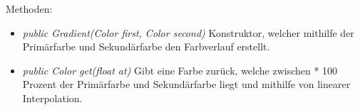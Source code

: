 Methoden:
\begin{itemize} 
    \item \emph{public Gradient(Color first, Color second)} Konstruktor, welcher mithilfe der Primärfarbe und Sekundärfarbe den Farbverlauf erstellt.
    \item \emph{public Color get(float at)} Gibt eine Farbe zurück, welche zwischen * 100 Prozent der Primärfarbe und Sekundärfarbe liegt und mithilfe von linearer Interpolation.
\end{itemize}